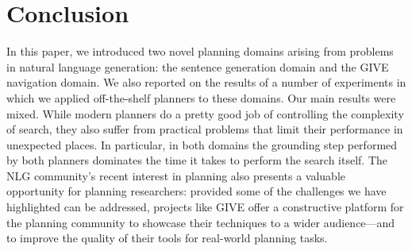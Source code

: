 \section{Conclusion} \label{sec:conclusion}

In this paper, we introduced two novel planning domains arising from
problems in natural language generation: the sentence generation domain and
the GIVE navigation domain. We also reported on the results of a number of
experiments in which we applied off-the-shelf planners to these domains.
Our main results were mixed. While modern planners do a pretty good job of
controlling the complexity of search, they also suffer from practical
problems that limit their performance in unexpected places. In particular,
in both domains the grounding step performed by both planners dominates the
time it takes to perform the search itself. The NLG community's recent
interest in planning also presents a valuable opportunity for planning
researchers: provided some of the challenges we have highlighted can be
addressed, projects like GIVE offer a constructive platform for the
planning community to showcase their techniques to a wider audience---and
to improve the quality of their tools for real-world planning tasks.




